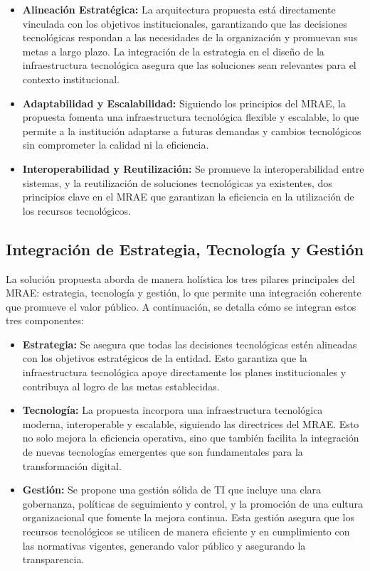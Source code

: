 \begin{itemize}
    \item \textbf{Alineación Estratégica: } La arquitectura propuesta está directamente vinculada con los objetivos institucionales, garantizando que las decisiones tecnológicas respondan a las necesidades de la organización y promuevan sus metas a largo plazo. La integración de la estrategia en el diseño de la infraestructura tecnológica asegura que las soluciones sean relevantes para el contexto institucional.
    \item \textbf{Adaptabilidad y Escalabilidad: }Siguiendo los principios del MRAE, la propuesta fomenta una infraestructura tecnológica flexible y escalable, lo que permite a la institución adaptarse a futuras demandas y cambios tecnológicos sin comprometer la calidad ni la eficiencia.
    \item \textbf{Interoperabilidad y Reutilización: }Se promueve la interoperabilidad entre sistemas, y la reutilización de soluciones tecnológicas ya existentes, dos principios clave en el MRAE que garantizan la eficiencia en la utilización de los recursos tecnológicos.
\end{itemize}


\subsection{Integración de Estrategia, Tecnología y Gestión }
La solución propuesta aborda de manera holística los tres pilares principales del MRAE: estrategia, tecnología y gestión, lo que permite una integración coherente que promueve el valor público. A continuación, se detalla cómo se integran estos tres componentes:
\begin{itemize}
    \item \textbf{Estrategia: }Se asegura que todas las decisiones tecnológicas estén alineadas con los objetivos estratégicos de la entidad. Esto garantiza que la infraestructura tecnológica apoye directamente los planes institucionales y contribuya al logro de las metas establecidas.
    \item \textbf{Tecnología: }La propuesta incorpora una infraestructura tecnológica moderna, interoperable y escalable, siguiendo las directrices del MRAE. Esto no solo mejora la eficiencia operativa, sino que también facilita la integración de nuevas tecnologías emergentes que son fundamentales para la transformación digital.
    \item \textbf{Gestión: }Se propone una gestión sólida de TI que incluye una clara gobernanza, políticas de seguimiento y control, y la promoción de una cultura organizacional que fomente la mejora continua. Esta gestión asegura que los recursos tecnológicos se utilicen de manera eficiente y en cumplimiento con las normativas vigentes, generando valor público y asegurando la transparencia.
\end{itemize}

